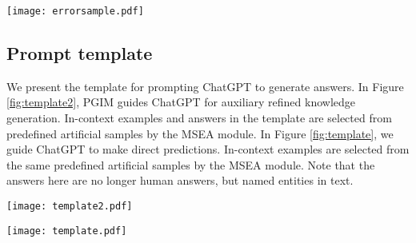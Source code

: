 \documentclass[11pt]{article}
\begin{document}
\begin{figure*}
	\centering
	\texttt{[image: errorsample.pdf]}
	\caption{Some mislabeled examples of Twitter-2015 datasets. }
	\label{fig:error cases}
\end{figure*}

\subsection{Prompt template}
\label{templatephoto}
We present the template for prompting ChatGPT to generate answers. 
In Figure \ref{fig:template2}, PGIM guides ChatGPT for auxiliary refined knowledge generation. In-context examples and answers in the template are selected from predefined artificial samples by the MSEA module. 
In Figure \ref{fig:template}, we guide ChatGPT to make direct predictions. 
In-context examples are selected from the same predefined artificial samples by the MSEA module. Note that the answers here are no longer human answers, but named entities in text. 


\begin{figure*}
	\centering
	\texttt{[image: template2.pdf]}
	\caption{A prompt template for ChatGPT to make auxiliary explanation.}
	\label{fig:template2}
\end{figure*}

\begin{figure*}
	\centering
	\texttt{[image: template.pdf]}
	\caption{A prompt template for ChatGPT to direct predict.}
	\label{fig:template}
\end{figure*}
\end{document}
